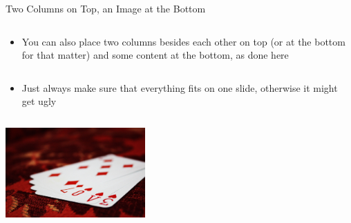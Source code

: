 \documentclass{ltusimple}
\begin{document}
\begin{slide}{Two Columns on Top, an Image at the Bottom}
	\begin{column}
		\begin{itemize}
			\item You can also place two columns besides each other on top (or at the bottom for that matter) and some content at the bottom, as done here
		\end{itemize}
	\end{column}
	\begin{column}
		\begin{itemize}
			\item Just always make sure that everything fits on one slide, otherwise it might get ugly
		\end{itemize}
	\end{column}
	\begin{center}
		\includegraphics[width=0.4\textwidth]{template/example}
	\end{center}
\end{slide}
\end{document}
